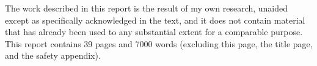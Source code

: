
\begin{declaration}

    The work described in this report is the result of my own research, unaided except as specifically acknowledged in the text, and it does not contain material that has already been used to any substantial extent for a comparable purpose. This report contains 39 pages and 7000 words (excluding this page, the title page, and the safety appendix).


\end{declaration}

